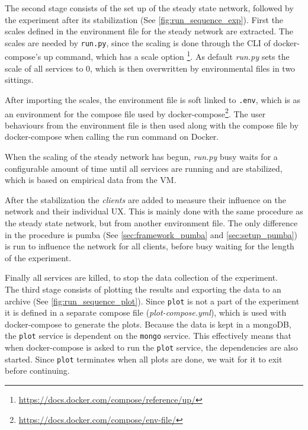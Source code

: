 \noindent The second stage consists of the set up of the steady state network, followed by the experiment after its stabilization (See \autoref{fig:run_sequence_exp}). First the scales defined in the environment file for the steady network are extracted. The scales are needed by \texttt{run.py}, since the scaling is done through the \ac{CLI} of docker-compose's up command, which has a scale option \footnote{\url{https://docs.docker.com/compose/reference/up/}}. As default \textit{run.py} sets the scale of all services to 0, which is then overwritten by environmental files in two sittings.

After importing the scales, the environment file is soft linked to \texttt{.env}, which is as an environment for the compose file used by docker-compose\footnote{\url{https://docs.docker.com/compose/env-file/}}.
The user behaviours from the environment file is then used along with the compose file by docker-compose when calling the run command on Docker.

When the scaling of the steady network has begun, \textit{run.py} busy waits for a configurable amount of time until all services are running and are stabilized, which is based on empirical data from the \ac{VM}.

After the stabilization the \textit{clients} are added to measure their influence on the network and their individual \ac{UX}. This is mainly done with the same procedure as the steady state network, but from another environment file. The only difference in the procedure is pumba (See \autoref{sec:framework_pumba} and \ref{sec:setup_pumba}) is run to influence the network for all clients, before busy waiting for the length of the experiment.

Finally all services are killed, to stop the data collection of the experiment.
\\


\noindent The third stage consists of plotting the results and exporting the data to an archive (See \autoref{fig:run_sequence_plot}). Since \texttt{plot} is not a part of the experiment it is defined in a separate compose file (\textit{plot-compose.yml}), which is used with docker-compose to generate the plots. Because the data is kept in a mongoDB, the \texttt{plot} service is dependent on the \texttt{mongo} service. This effectively means that when docker-compose is asked to run the \texttt{plot} service, the dependencies are also started. Since \texttt{plot} terminates when all plots are done, we wait for it to exit before continuing.

